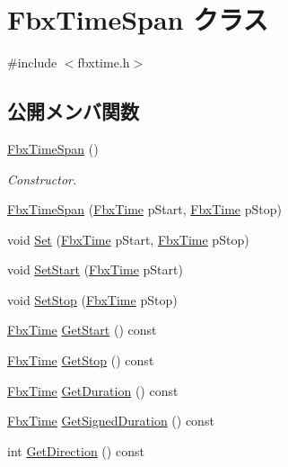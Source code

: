 \hypertarget{class_fbx_time_span}{}\section{Fbx\+Time\+Span クラス}
\label{class_fbx_time_span}


{\ttfamily \#include $<$fbxtime.\+h$>$}

\subsection*{公開メンバ関数}
\begin{DoxyCompactItemize}
\item 
\hyperlink{class_fbx_time_span_a4eed31104b9afeb2b1a53bd7b2b1f823}{Fbx\+Time\+Span} ()
\begin{DoxyCompactList}\small\item\em Constructor. \end{DoxyCompactList}\item 
\hyperlink{class_fbx_time_span_a50d9ebc7163501aafd108d80673c191b}{Fbx\+Time\+Span} (\hyperlink{class_fbx_time}{Fbx\+Time} p\+Start, \hyperlink{class_fbx_time}{Fbx\+Time} p\+Stop)
\item 
void \hyperlink{class_fbx_time_span_a29861241ccf52ec9c3f491d336209ff7}{Set} (\hyperlink{class_fbx_time}{Fbx\+Time} p\+Start, \hyperlink{class_fbx_time}{Fbx\+Time} p\+Stop)
\item 
void \hyperlink{class_fbx_time_span_a453592f02b54bc27d664386c1d37abda}{Set\+Start} (\hyperlink{class_fbx_time}{Fbx\+Time} p\+Start)
\item 
void \hyperlink{class_fbx_time_span_a7b0577b88300d141657ed2092228c867}{Set\+Stop} (\hyperlink{class_fbx_time}{Fbx\+Time} p\+Stop)
\item 
\hyperlink{class_fbx_time}{Fbx\+Time} \hyperlink{class_fbx_time_span_a262c2fedcf2bdf205554df6fc8c7f7b9}{Get\+Start} () const
\item 
\hyperlink{class_fbx_time}{Fbx\+Time} \hyperlink{class_fbx_time_span_a1d5362bd784ccd554a2c6faad2227c9b}{Get\+Stop} () const
\item 
\hyperlink{class_fbx_time}{Fbx\+Time} \hyperlink{class_fbx_time_span_a292fce840a8caee4247157e24cbd787c}{Get\+Duration} () const
\item 
\hyperlink{class_fbx_time}{Fbx\+Time} \hyperlink{class_fbx_time_span_a73c72bdec019e41044aa6f4afb59fef3}{Get\+Signed\+Duration} () const
\item 
int \hyperlink{class_fbx_time_span_ac53a2eda33c4e23da9417d0b76b67a54}{Get\+Direction} () const

\end{DoxyCompactItemize}

